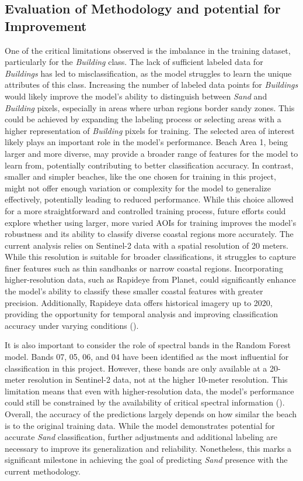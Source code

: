 \documentclass[a4paper,12pt]{article}
\renewcommand{\familydefault}{\sfdefault}
\begin{document}
\subsection{Evaluation of Methodology and potential for Improvement}
One of the critical limitations observed is the imbalance in the training dataset, particularly for the \textit{Building} class. The lack of sufficient labeled data for \textit{Buildings} has led to misclassification, as the model struggles to learn the unique attributes of this class. Increasing the number of labeled data points for \textit{Buildings} would likely improve the model’s ability to distinguish between \textit{Sand} and \textit{Building} pixels, especially in areas where urban regions border sandy zones. This could be achieved by expanding the labeling process or selecting areas with a higher representation of \textit{Building} pixels for training.
The selected area of interest likely plays an important role in the model's performance. Beach Area 1, being larger and more diverse, may provide a broader range of features for the model to learn from, potentially contributing to better classification accuracy. In contrast, smaller and simpler beaches, like the one chosen for training in this project, might not offer enough variation or complexity for the model to generalize effectively, potentially leading to reduced performance. While this choice allowed for a more straightforward and controlled training process, future efforts could explore whether using larger, more varied AOIs for training improves the model’s robustness and its ability to classify diverse coastal regions more accurately.
The current analysis relies on Sentinel-2 data with a spatial resolution of 20 meters. While this resolution is suitable for broader classifications, it struggles to capture finer features such as thin sandbanks or narrow coastal regions. Incorporating higher-resolution data, such as Rapideye from Planet, could significantly enhance the model's ability to classify these smaller coastal features with greater precision. Additionally, Rapideye data offers historical imagery up to 2020, providing the opportunity for temporal analysis and improving classification accuracy under varying conditions (\cite{planet_rapideye_2024}).

It is also important to consider the role of spectral bands in the Random Forest model. Bands 07, 05, 06, and 04 have been identified as the most influential for classification in this project. However, these bands are only available at a 20-meter resolution in Sentinel-2 data, not at the higher 10-meter resolution. This limitation means that even with higher-resolution data, the model's performance could still be constrained by the availability of critical spectral information (\cite{gisgeography_sentinel_2019}). 
Overall, the accuracy of the predictions largely depends on how similar the beach is to the original training data. While the model demonstrates potential for accurate \textit{Sand} classification, further adjustments and additional labeling are necessary to improve its generalization and reliability. Nonetheless, this marks a significant milestone in achieving the goal of predicting \textit{Sand} presence with the current methodology.


\newpage
\printbibliography
\newpage
\renewcommand{\familydefault}{\sfdefault}  
\thispagestyle{empty}
\listoffigures
\renewcommand{\familydefault}{\sfdefault}  
\thispagestyle{empty}
\listoftables
\renewcommand{\familydefault}{\sfdefault}  
\thispagestyle{empty}
\end{document}
